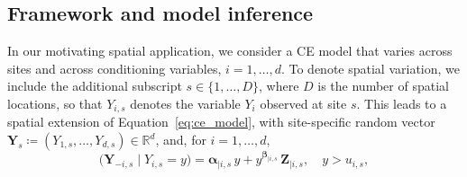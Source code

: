 \documentclass[12pt,compact]{article}
\begin{document}
\subsection{Framework and model inference}
\label{subsec:ce_setup}

In our motivating spatial application, we consider a CE model that varies across sites and across conditioning variables, $i = 1, \ldots, d$.
To denote spatial variation, we include the additional subscript $s \in \{1, \ldots, D\}$, where $D$ is the number of spatial locations, so that $Y_{i,s}$ denotes the variable $Y_i$ observed at site $s$.
This leads to a spatial extension of Equation~\eqref{eq:ce_model}, with site-specific random vector $\symbf{Y}_{s} \coloneq \left(Y_{1,s}, \ldots, Y_{d,s}\right) \in \mathbb{R}^d$, and, for $i = 1, \ldots, d$,
\begin{equation} \label{eq:ce_model_spat}
  \bigl(\symbf{Y}_{-i, s} \mid Y_{i, s} = y\bigr) 
    = \symbf{\alpha}_{\mid i, s} \, y 
      + y^{\symbf{\beta}_{\mid i, s}} \, \symbf{Z}_{\mid i, s}, 
      \quad y > u_{i, s}, 
\end{equation}
\end{document}
